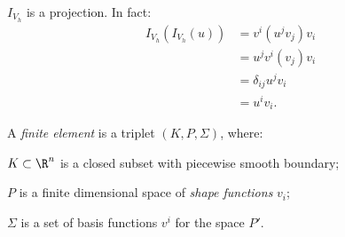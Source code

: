 \begin{remark}
$I_{V_h}$ is a projection. In fact:
\begin{align}
I_{V_h}(I_{V_h}(u)) &= v^i (u^j  v_j) v_i \\
&= u^j v^i(v_j) v_i \\
&= \delta_{ij} u^j  v_i \\
&= u^i  v_i.
\end{align}
\end{remark}

\begin{definition}[Ciarlet, 1978] 
A \emph{finite element} is a triplet $(K,P,\Sigma)$, where:
\begin{romanlist}
\item $K\subset \R^n$ is a closed subset with piecewise smooth boundary;
\item $P$ is a finite dimensional space of \emph{shape functions} $v_i$;
\item $\Sigma$ is a set of basis functions $v^i$ for the space $P'$.
\end{romanlist}
\end{definition}

